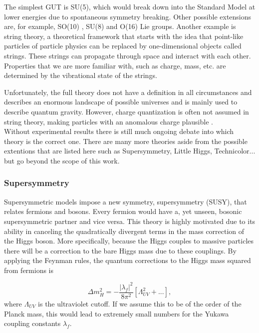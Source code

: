 The simplest GUT is SU(5), which would break down into the Standard Model at lower energies due to spontaneous symmetry breaking. Other possible extensions are, for example, SO(10) \cite{Bertolini:2009qj}, SU(8) \cite{Yu:1984pb} and O(16) Lie groups. Another example is string theory, a theoretical framework that starts with the idea that point-like particles of particle physics can be replaced by one-dimensional objects called strings. These strings can propagate through space and interact with each other. Properties that we are more familiar with, such as charge, mass, etc. are determined by the vibrational state of the strings.

Unfortunately, the full theory does not have a definition in all circumstances and describes an enormous landscape of possible universes and is mainly used to describe quantum gravity. However, charge quantization is often not assumed in string theory, making particles with an anomalous charge plausible \cite{Wen:1985qj,Athanasiu:1988uj}.\\


\noindent Without experimental results there is still much ongoing debate into which theory is the correct one. There are many more theories aside from the possible extentions that are listed here such as Supersymmetry, Little Higgs, Technicolor... but go beyond the scope of this work.

\iffalse
\subsubsection*{Supersymmetry}
Supersymmetric models impose a new symmetry, supersymmetry (SUSY), that relates fermions and bosons. Every fermion would have a, yet unseen, bosonic supersymmetric partner and vice versa. This theory is highly motivated due to its ability in canceling the quadratically divergent terms in the mass correction of the Higgs boson. More specifically, because the Higgs couples to massive particles there will be a correction to the bare Higgs mass due to these couplings. By applying the Feynman rules, the quantum corrections to the Higgs mass squared from fermions is 

\begin{equation}
\label{eq:higgscorrections}
\Delta m^2_H = -\frac{\left| \lambda_f \right|^2}{8\pi^2} \left[ \Lambda^2_{UV}+...\right],
\end{equation}
\noindent where $\Lambda_{UV}$ is the ultraviolet cutoff. If we assume this to be of the order of the Planck mass, this would lead to extremely small numbers for the Yukawa coupling constants $\lambda_f$.

